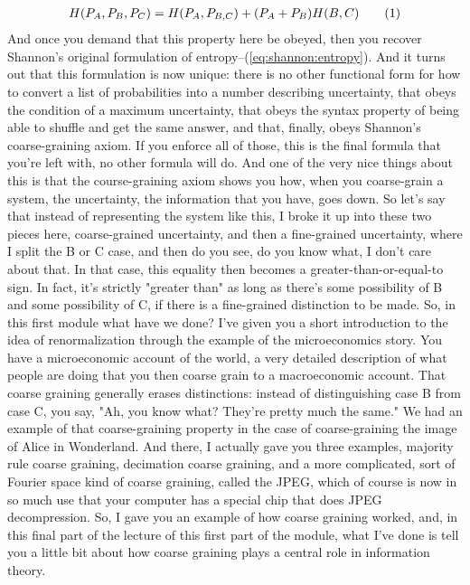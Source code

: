 \documentclass[]{article}
\newcommand\numberthis{\addtocounter{equation}{1}\tag{\theequation}}
\begin{document}
\begin{align*}
H (P_A,P_B,P_C) = H(P_A,P_{B,C}) + (P_A+P_B)H(B,C) \numberthis \label{eq:coarse_grain_axiom}
\end{align*}
And once you demand
that this property here be obeyed,
then you recover Shannon's
original formulation of entropy--(\ref{eq:shannon:entropy}). And it turns out
that this formulation is now unique:
there is no other functional form
for how to convert a list of probabilities
into a number describing uncertainty,
that obeys the condition
of a maximum uncertainty,
that obeys the syntax property
of being able to shuffle
and get the same answer,
and that, finally, obeys
Shannon's coarse-graining axiom. If you enforce all of those,
this is the final formula
that you're left with,
no other formula will do.
And one of the very nice things about this
is that the course-graining axiom
shows you how,
when you coarse-grain a system,
the uncertainty,
the information that you have,
goes down.
So let's say that instead of representing
the system like this,
I broke it up into these two pieces here,
coarse-grained uncertainty,
and then a fine-grained uncertainty,
where I split the B or C case,
and then do you see, do you know what,
I don't care about that.
In that case, this equality then becomes
a greater-than-or-equal-to sign.
In fact, it's strictly "greater than"
as long as there's some possibility of B
and some possibility of C,
if there is a fine-grained distinction
to be made.
So, in this first module
what have we done?
I've given you a short introduction
to the idea of renormalization
through the example
of the microeconomics story.
You have a microeconomic
account of the world,
a very detailed description
of what people are doing
that you then coarse grain
to a macroeconomic account.
That coarse graining generally
erases distinctions:
instead of distinguishing
case B from case C,
you say, "Ah, you know what?
They're pretty much the same."
We had an example
of that coarse-graining property
in the case of coarse-graining
the image of Alice in Wonderland.
And there, I actually gave you
three examples,
majority rule coarse graining,
decimation coarse graining,
and a more complicated, sort of
Fourier space kind of coarse graining,
called the JPEG,
which of course is now in so much use
that your computer has a special chip
that does JPEG decompression.
So, I gave you an example
of how coarse graining worked,
and, in this final part of the lecture
of this first part of the module,
what I've done
is tell you a little bit about
how coarse graining plays a central role
in information theory.
\end{document}
